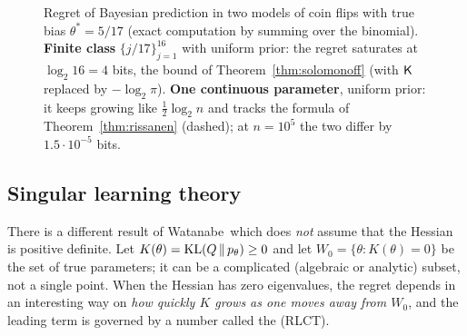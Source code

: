 \begin{figure}[tb]
\centering
{}
\caption{Regret of Bayesian prediction in two models of coin flips with true bias $\theta^*=5/17$ (exact computation by summing over the binomial). \textbf{Finite class} $\{j/17\}_{j=1}^{16}$ with uniform prior: the regret saturates at $\log_2 16=4$ bits, the bound of Theorem~\ref{thm:solomonoff} (with $\mathsf{K}$ replaced by $-\log_2\pi$). \textbf{One continuous parameter}, uniform prior: it keeps growing like $\frac12\log_2n$ and tracks the formula of Theorem~\ref{thm:rissanen} (dashed); at $n=10^5$ the two differ by $1.5\cdot10^{-5}$ bits.}
\label{fig:L3-regret}
\end{figure}

\subsection{Singular learning theory}\label{sec:L3-watanabe}
There is a different result of Watanabe\,\citep{watanabe2009,watanabe2018} which does \emph{not} assume that the Hessian is positive definite. Let $K(\theta)=\operatorname{KL}(Q\,\|\,p_\theta)\ge0$ and let $W_0=\{\theta:K(\theta)=0\}$ be the set of true parameters; it can be a complicated (algebraic or analytic) subset, not a single point.
When the Hessian has zero eigenvalues, the regret depends in an interesting way on \emph{how quickly $K$ grows as one moves away from $W_0$}, and the leading term is governed by a number called the  (RLCT).

